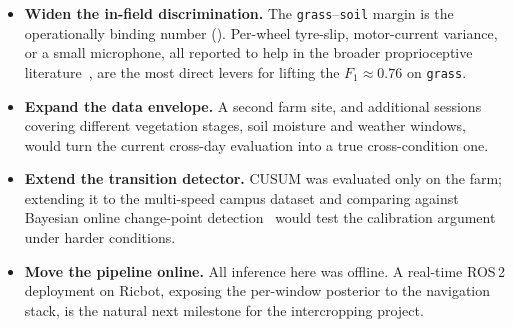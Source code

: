 \begin{itemize}
    \item \textbf{Widen the in-field discrimination.} The \texttt{grass}--\texttt{soil} margin is the operationally binding number (). Per-wheel tyre-slip, motor-current variance, or a small microphone, all reported to help in the broader proprioceptive literature~\cite{DuPont2008,Bermudez2012}, are the most direct levers for lifting the $F_1 \approx 0.76$ on \texttt{grass}.
    \item \textbf{Expand the data envelope.} A second farm site, and additional sessions covering different vegetation stages, soil moisture and weather windows, would turn the current cross-day evaluation into a true cross-condition one.
    \item \textbf{Extend the transition detector.} CUSUM was evaluated only on the farm; extending it to the multi-speed campus dataset and comparing against Bayesian online change-point detection~\cite{Adams2007} would test the calibration argument under harder conditions.
    \item \textbf{Move the pipeline online.} All inference here was offline. A real-time ROS\,2 deployment on Ricbot, exposing the per-window posterior to the navigation stack, is the natural next milestone for the intercropping project.
\end{itemize}
